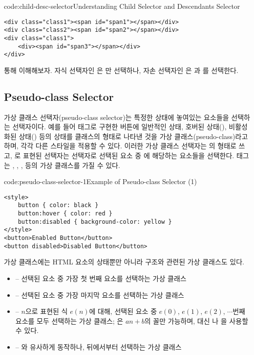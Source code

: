 \begin{codeenv}{code:child-desc-selector}{Understanding Child Selector and Descendants Selector}\begin{verbatim}
<div class="class1"><span id="span1"></span></div>
<div class="class2"><span id="span2"></span></div>
<div class="class1">
    <div><span id="span3"></span></div>
</div>
\end{verbatim}
\end{codeenv}
\clearpage

\를 통해 이해해보자. 자식 선택자인 은 만 선택하나, 자손 선택자인 은 과 를 선택한다.

\subsection*{Pseudo-class Selector}
가상 클래스 선택자(pseudo-class selector)는 특정한 상태에 놓여있는 요소들을 선택하는 선택자이다. 예를 들어  태그로 구현한 버튼에 일반적인 상태, 호버된 상태(), 비활성화된 상태() 등의 상태를 클래스의 형태로 나타낸 것을 가상 클래스(pseudo-class)라고 하며, 각각 다른 스타일을 적용할 수 있다. 이러한 가상 클래스 선택자는 의 형태로 쓰고, 로 표현된 선택자는  선택자로 선택된 요소 중 에 해당하는 요소들을 선택한다.  태그는 , , ,  등의 가상 클래스를 가질 수 있다.

\begin{codeenv}{code:pseudo-class-selector-1}{Example of Pseudo-class Selector (1)}\begin{verbatim}
<style>
    button { color: black }
    button:hover { color: red }
    button:disabled { background-color: yellow }
</style>
<button>Enabled Button</button>
<button disabled>Disabled Button</button>
\end{verbatim}
\end{codeenv}

가상 클래스에는 HTML 요소의 상태뿐만 아니라 구조와 관련된 가상 클래스도 있다.

\begin{itemize}
    \item {} – 선택된 요소 중 가장 첫 번째 요소를 선택하는 가상 클래스
    \item {} – 선택된 요소 중 가장 마지막 요소를 선택하는 가상 클래스
    \item {} – $n$으로 표현된 식 $e(n)$에 대해, 선택된 요소 중 $e(0)$, $e(1)$, $e(2)$, $\cdots$번째 요소를 모두 선택하는 가상 클래스; 은 $an+b$의 꼴만 가능하며,  대신 나 을 사용할 수 있다.
    \item {} – 와 유사하게 동작하나, 뒤에서부터 선택하는 가상 클래스
\end{itemize}

